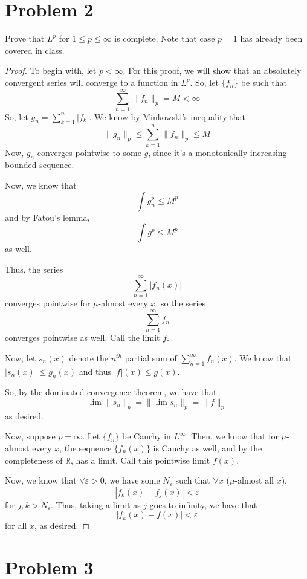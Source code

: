 \documentclass[fontsize=11pt]{scrartcl} %
\numberwithin{equation}{section} %
\numberwithin{figure}{section} %
\numberwithin{table}{section} %
\newcommand{\R}{\mathbb{R}}
\begin{document}
\section*{Problem 2}
Prove that $L^p$ for $1\leq p\leq\infty$ is complete. Note that case $p=1$ has
already been covered in class.
\\
\begin{proof}
To begin with, let $p<\infty$. For this proof, we will show that an absolutely
    convergent series will converge to a function in $L^p$. So, let $\{f_n\}$ be
    such that
    \[
        \sum_{n=1}^{\infty}\|f_n\|_p = M<\infty
    \]
    So, let $g_n = \sum_{k=1}^n |f_k|$. We know by Minkowski's inequality that
    \[
        \|g_n\|_p \leq \sum_{k=1}^{n}\|f_n\|_p \leq M
    \]
    Now, $g_n$ converges pointwise to some $g$, since it's a monotonically
    increasing bounded sequence.

    Now, we know that
    \[
        \int g_n^p \leq M^p
    \]
    and by Fatou's lemma,
    \[
        \int g^p \leq M^p
    \]
    as well.

    Thus, the series
    \[
        \sum_{n=1}^{\infty}|f_n(x)|
    \]
    converges pointwise for $\mu$-almost every $x$, so the series
    \[
        \sum_{n=1}^{\infty}f_n
    \]
    converges pointwise as well. Call the limit $f$.
    
    Now, let $s_n(x)$ denote the $n^{th}$ partial sum of
    $\sum_{n=1}^{\infty}f_n(x)$. We know that $|s_n(x)| \leq g_n(x)$ and
    thus $|f|(x)\leq g(x)$.

    So, by the dominated convergence theorem, we have that
    \[
    \lim \|s_n\|_p =\|\lim s_n\|_p = \|f\|_p
    \]
    as desired.

    Now, suppose $p=\infty$. Let $\{f_n\}$ be Cauchy in $L^{\infty}$. Then, we
    know that for $\mu$-almost every $x$, the sequence $\{f_n(x)\}$ is Cauchy as well, and by
    the completeness of $\R$, has a limit. Call this pointwise limit $f(x)$.

    Now, we know that $\forall \varepsilon >0$, we have some $N_{\varepsilon}$
    such that $\forall x$ ($\mu$-almost all $x$),
    \[
        |f_k(x) - f_j(x)| < \varepsilon
    \]
        for $j,k > N_{\varepsilon}$. Thus, taking a limit as $j$ goes to
        infinity, we have that
        \[
            |f_k(x)-f(x)| < \varepsilon
        \]
        for all $x$, as desired.
\end{proof}

\section*{Problem 3}
\end{document}
